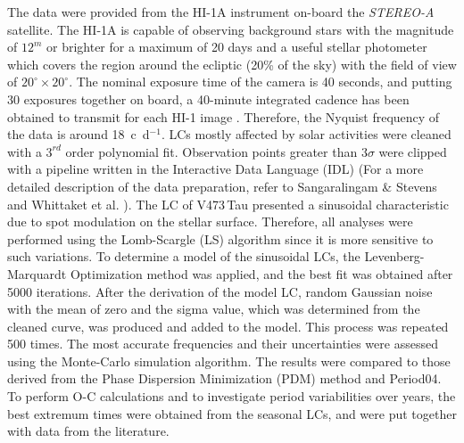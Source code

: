 \documentclass[]{article}
\begin{document}
The data were provided from the HI-1A instrument on-board the {\sl STEREO-A} satellite. The HI-1A is capable of observing background stars with the magnitude of $12^m$ or brighter for a maximum of 20 days and a useful stellar photometer which covers the region around the ecliptic (20\% of the sky) with the field of view of $20^{\circ} \times 20^{\circ}$. The nominal exposure time of the camera is 40 seconds, and putting 30 exposures together on board, a 40-minute integrated cadence has been obtained to transmit for each HI-1 image \cite{bib8}. Therefore, the Nyquist frequency of the data is around 18~c~d$^{-1}$. LCs mostly affected by solar activities were cleaned with a $3^{rd}$ order polynomial fit. Observation points greater than $3 \sigma$ were clipped with a pipeline written in the Interactive Data Language (IDL) (For a more detailed description of the data preparation, refer to Sangaralingam \& Stevens \cite{bib9} and Whittaket et al. \cite{bib10}). The LC of V473\,Tau presented a sinusoidal characteristic due to spot modulation on the stellar surface. Therefore, all analyses were performed using the Lomb-Scargle (LS) algorithm since it is more sensitive to such variations. To determine a model of the sinusoidal LCs, the Levenberg-Marquardt Optimization method was applied, and the best fit was obtained after 5000 iterations. After the derivation of the model LC, random Gaussian noise with the mean of zero and the sigma value, which was determined from the cleaned curve, was produced and added to the model. This process was repeated 500 times. The most accurate frequencies and their uncertainties were assessed using the Monte-Carlo simulation algorithm. The results were compared to those derived from the Phase Dispersion Minimization (PDM) method and Period04. To perform O-C calculations and to investigate period variabilities over years, the best extremum times  were obtained from the seasonal LCs, and were put together with data from the literature.
\end{document}
